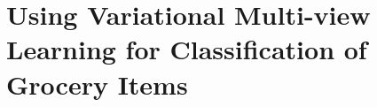 
\section{Using Variational Multi-view Learning for Classification of Grocery Items}
\label{sec:paperB}